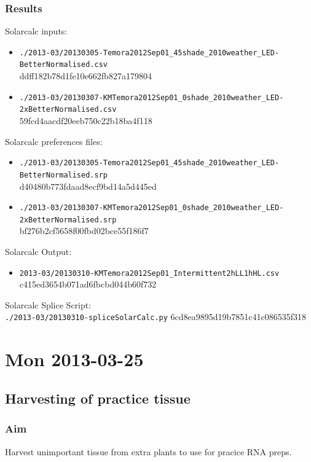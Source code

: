 \documentclass[12pt,a4paper]{book}
\begin{document}
    \subsection*{Results}
      Solarcalc inputs:
      \begin{itemize} \itemsep1pt \parskip0pt 
        \item \verb+./2013-03/20130305-Temora2012Sep01_45shade_2010weather_LED-BetterNormalised.csv+\\
          ddff182b78d1fe10e662fb827a179804
        \item \verb+./2013-03/20130307-KMTemora2012Sep01_0shade_2010weather_LED-2xBetterNormalised.csv+\\
          59fcd4aacdf20eeb750c22b18ba4f118
      \end{itemize}
      Solarcalc preferences files:
      \begin{itemize} \itemsep1pt \parskip0pt 
        \item \verb+./2013-03/20130305-Temora2012Sep01_45shade_2010weather_LED-BetterNormalised.srp+\\
          d40480b773fdaad8ecf9bd14a5d445ed
        \item \verb+./2013-03/20130307-KMTemora2012Sep01_0shade_2010weather_LED-2xBetterNormalised.srp+\\
          bf276b2cf5658f00fbd02bce55f186f7
      \end{itemize}
      Solarcalc Output:
      \begin{itemize} \itemsep1pt \parskip0pt 
        \item \verb+2013-03/20130310-KMTemora2012Sep01_Intermittent2hLL1hHL.csv+ \\
          c415ed3654b071ad6fbcbd044b60f732
      \end{itemize}
      Solarcalc Splice Script: \\
      \verb+./2013-03/20130310-spliceSolarCalc.py+ 6cd8ea9895d19b7851c41c086535f318\\


\chapter*{Mon 2013-03-25}
  \section*{Harvesting of practice tissue}
    \subsection*{Aim}
      Harvest unimportant tissue from extra plants to use for pracice RNA preps.
\end{document}
